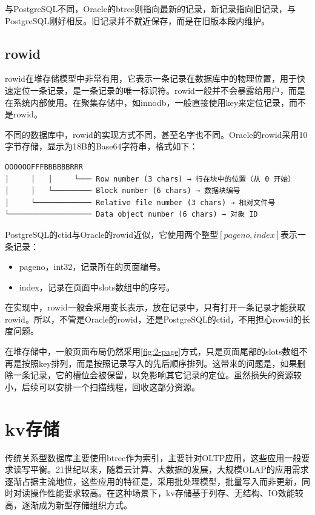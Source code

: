 与PostgreSQL不同，Oracle的btree则指向最新的记录，新记录指向旧记录，与PostgreSQL刚好相反。旧记录并不就近保存，而是在旧版本段内维护。

\subsection{rowid}

rowid在堆存储模型中非常有用，它表示一条记录在数据库中的物理位置，用于快速定位一条记录，是一条记录的唯一标识符。rowid一般并不会暴露给用户，而是在系统内部使用。在聚集存储中，如innodb，一般直接使用key来定位记录，而不是rowid。

不同的数据库中，rowid的实现方式不同，甚至名字也不同。Oracle的rowid采用10字节存储，显示为18B的Base64字符串，格式如下：
\begin{lstlisting}[style=verbose]
OOOOOOFFFBBBBBBRRR
│     │   │     └─── Row number (3 chars) → 行在块中的位置（从 0 开始）
│     │   └───────── Block number (6 chars) → 数据块编号
│     └───────────── Relative file number (3 chars) → 相对文件号
└─────────────────── Data object number (6 chars) → 对象 ID
\end{lstlisting}

PostgreSQL的ctid与Oracle的rowid近似，它使用两个整型$[pageno, index]$表示一条记录：
\begin{itemize}
    \item pageno，int32，记录所在的页面编号。
    \item index，记录在页面中slots数组中的序号。
\end{itemize}

在实现中，rowid一般会采用变长表示，放在记录中，只有打开一条记录才能获取rowid。所以，不管是Oracle的rowid，还是PostgreSQL的ctid，不用担心rowid的长度问题。

在堆存储中，一般页面布局仍然采用\figurename\ref{fig:2-page}方式，只是页面尾部的slots数组不再是按照key排列，而是按照记录写入的先后顺序排列。这带来的问题是，如果删除一条记录，它的槽位会被保留，以免影响其它记录的定位。虽然损失的资源较小，后续可以安排一个扫描线程，回收这部分资源。

\section{kv存储}

传统关系型数据库主要使用btree作为索引，主要针对OLTP应用，这些应用一般要求读写平衡。21世纪以来，随着云计算、大数据的发展，大规模OLAP的应用需求逐渐占据主流地位，这些应用的特征是，采用批处理模型，批量写入而非更新，同时对读操作性能要求较高。在这种场景下，kv存储基于列存、无结构、IO效能较高，逐渐成为新型存储组织方式。

